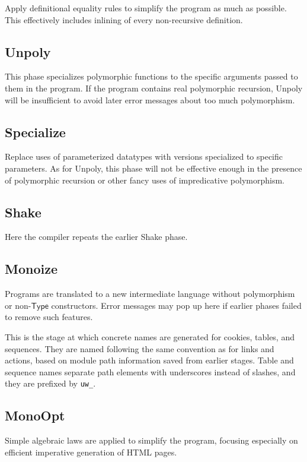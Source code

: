 \documentclass{article}
\newcommand{\mt}[1]{\mathsf{#1}}
\begin{document}
Apply definitional equality rules to simplify the program as much as possible.  This effectively includes inlining of every non-recursive definition.

\subsection{Unpoly}

This phase specializes polymorphic functions to the specific arguments passed to them in the program.  If the program contains real polymorphic recursion, Unpoly will be insufficient to avoid later error messages about too much polymorphism.

\subsection{Specialize}

Replace uses of parameterized datatypes with versions specialized to specific parameters.  As for Unpoly, this phase will not be effective enough in the presence of polymorphic recursion or other fancy uses of impredicative polymorphism.

\subsection{Shake}

Here the compiler repeats the earlier Shake phase.

\subsection{Monoize}

Programs are translated to a new intermediate language without polymorphism or non-$\mt{Type}$ constructors.  Error messages may pop up here if earlier phases failed to remove such features.

This is the stage at which concrete names are generated for cookies, tables, and sequences.  They are named following the same convention as for links and actions, based on module path information saved from earlier stages.  Table and sequence names separate path elements with underscores instead of slashes, and they are prefixed by \texttt{uw\_}.

\subsection{MonoOpt}

Simple algebraic laws are applied to simplify the program, focusing especially on efficient imperative generation of HTML pages.
\end{document}

